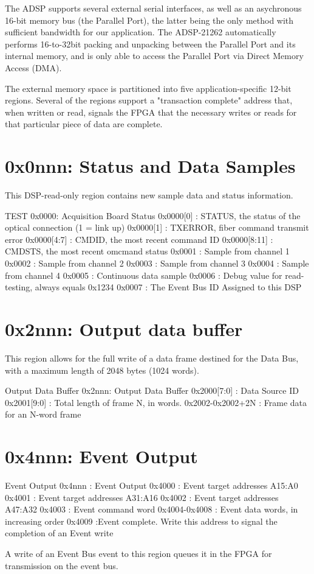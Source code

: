 
 The ADSP supports several external serial interfaces, as well
as an asychronous 16-bit memory bus (the Parallel Port), the latter
being the only method with sufficient bandwidth for our application.
The ADSP-21262 automatically performs 16-to-32bit packing and
unpacking between the Parallel Port and its internal memory, and is
only able to access the Parallel Port via Direct Memory Access (DMA).


 The external memory space is partitioned into five
application-specific 12-bit regions. Several of the regions support a
"transaction complete" address that, when written or read, signals the
FPGA that the necessary writes or reads for that particular piece of
data are complete.  

\section{0x0nnn: Status and  Data  Samples}
This DSP-read-only region contains new sample data and status
information.
\begin{memmap}{TEST}
0x0000: Acquisition Board Status
0x0000[0] : STATUS, the status of the optical connection (1 = link up)
0x0000[1] : TXERROR, fiber command transmit error
0x0000[4:7] : CMDID, the most recent command ID
0x0000[8:11] : CMDSTS, the most recent omcmand status
0x0001 : Sample from channel 1
0x0002 : Sample from channel 2
0x0003 : Sample from channel 3
0x0004 : Sample from channel 4
0x0005 :  Continuous data sample
0x0006 : Debug value for read-testing, always equals 0x1234
0x0007 : The Event Bus ID Assigned to this DSP
\end{memmap}


\section{0x2nnn: Output data buffer} 
 This region allows for the full write of a data frame destined
for the Data Bus, with a maximum length of 2048 bytes (1024
words).

\begin{memmap}{Output Data Buffer}
0x2nnn: Output Data Buffer
0x2000[7:0] : Data Source ID
0x2001[9:0] : Total length of frame N, in words. 
0x2002-0x2002+2N : Frame data for an N-word frame
\end{memmap}


\section{0x4nnn: Event Output} 
\begin{memmap}{Event Output}
0x4nnn : Event Output
0x4000 : Event target addresses A15:A0
0x4001 : Event target addresses A31:A16 
0x4002 : Event target addresses A47:A32
0x4003 : Event command word
0x4004-0x4008 : Event data words, in increasing order
0x4009 :Event complete. Write this address to signal the completion of an Event write
\end{memmap}
A write of an Event Bus event to this region queues it in the FPGA for
transmission on the event bus.

